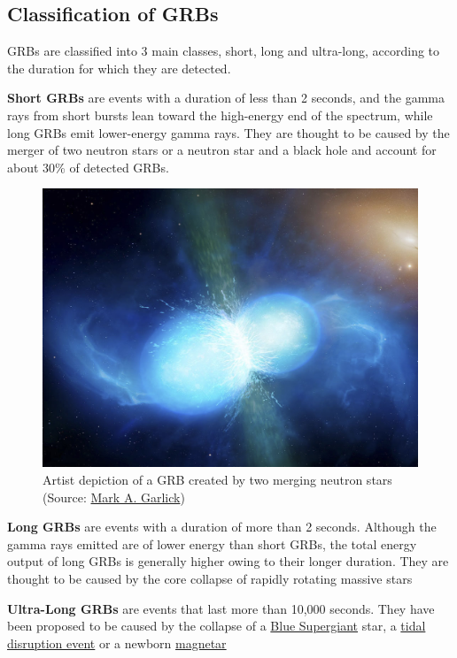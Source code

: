 \documentclass[11pt]{book} %
\begin{document}
\subsection{Classification of GRBs}
GRBs are classified into 3 main classes, short, long and ultra-long, according to the duration for which they are detected.

\textbf{Short GRBs} are events with a duration of less than 2 seconds, and the gamma rays from short bursts lean toward the high-energy end of the spectrum, while long GRBs emit lower-energy gamma rays. They are thought to be caused by the merger of two neutron stars or a neutron star and a black hole and account for about 30\% of detected GRBs.

\begin{figure}[H]
    \centering
    \includegraphics[width=\textwidth]{Pictures/neutronstars.jpg}
    \caption{Artist depiction of a GRB created by two merging neutron stars (Source: \href{http://www.markgarlick.com/index.html}{Mark A. Garlick})}
\end{figure}

\textbf{Long GRBs} are events with a duration of more than 2 seconds. Although the gamma rays emitted are of lower energy than short GRBs, the total energy output of long GRBs is generally higher owing to their longer duration. They are thought to be caused by the core collapse of rapidly rotating massive stars 

\textbf{Ultra-Long GRBs} are events that last more than 10,000 seconds. They have been proposed to be caused by the collapse of a \href{https://en.wikipedia.org/wiki/Blue_supergiant}{Blue Supergiant} star, a \href{https://en.wikipedia.org/wiki/Tidal_disruption_event}{tidal disruption event} or a newborn \href{https://en.wikipedia.org/wiki/Magnetar}{magnetar}
\end{document}
